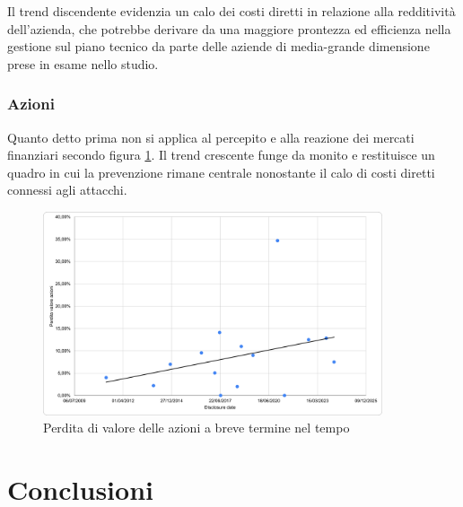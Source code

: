 \documentclass[12pt,a4paper,openright,twoside]{report}
\begin{document}
Il trend discendente evidenzia un calo dei costi diretti in relazione alla redditivit\`a dell'azienda, che potrebbe derivare da una maggiore prontezza ed efficienza nella gestione sul piano tecnico da parte delle aziende di media-grande dimensione prese in esame nello studio.\\


\subsection{Azioni}
Quanto detto prima non si applica al percepito e alla reazione dei mercati finanziari secondo figura \ref{fig:stockloss}. Il trend crescente funge da monito e restituisce un quadro in cui la prevenzione rimane centrale nonostante il calo di costi diretti connessi agli attacchi.\\
\begin{figure}[H]
    \centering
    \includegraphics[width=10cm]{figures/stocks-date.png}
    \caption{Perdita di valore delle azioni a breve termine nel tempo}
    \label{fig:stockloss}
\end{figure}

\clearpage{\pagestyle{empty}\cleardoublepage}



\chapter{Conclusioni}
\end{document}
